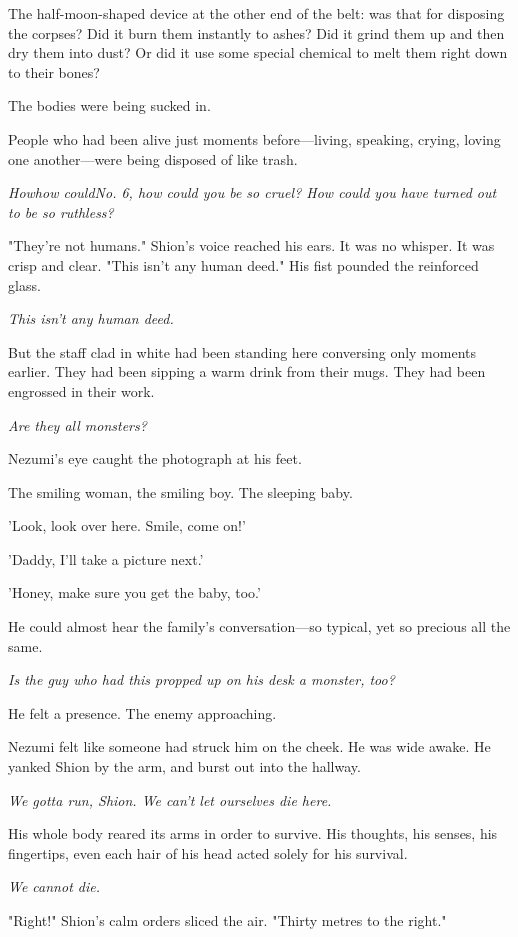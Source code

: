 The half-moon-shaped device at the other end of the belt: was that for
disposing the corpses? Did it burn them instantly to ashes? Did it grind
them up and then dry them into dust? Or did it use some special chemical
to melt them right down to their bones?

The bodies were being sucked in.

People who had been alive just moments before---living, speaking, crying,
loving one another---were being disposed of like trash.

\emph{How\el how could\el No. 6, how could you be so cruel? How could you have
turned out to be so ruthless?}

"They're not humans." Shion's voice reached his ears. It was no whisper.
It was crisp and clear. "This isn't any human deed." His fist pounded
the reinforced glass.

\emph{This isn't any human deed.}

But the staff clad in white had been standing here conversing only
moments earlier. They had been sipping a warm drink from their mugs.
They had been engrossed in their work.

\emph{Are they all monsters?}

Nezumi's eye caught the photograph at his feet.

The smiling woman, the smiling boy. The sleeping baby.

'Look, look over here. Smile, come on!'

'Daddy, I'll take a picture next.'

'Honey, make sure you get the baby, too.'

He could almost hear the family's conversation---so typical, yet so
precious all the same.

\emph{Is the guy who had this propped up on his desk a monster, too?}

He felt a presence. The enemy approaching.

Nezumi felt like someone had struck him on the cheek. He was wide awake.
He yanked Shion by the arm, and burst out into the hallway.

\emph{We gotta run, Shion. We can't let ourselves die here.}

His whole body reared its arms in order to survive. His thoughts, his
senses, his fingertips, even each hair of his head acted solely for his
survival.

\emph{We cannot die.}

"Right!" Shion's calm orders sliced the air. "Thirty metres to the
right."

